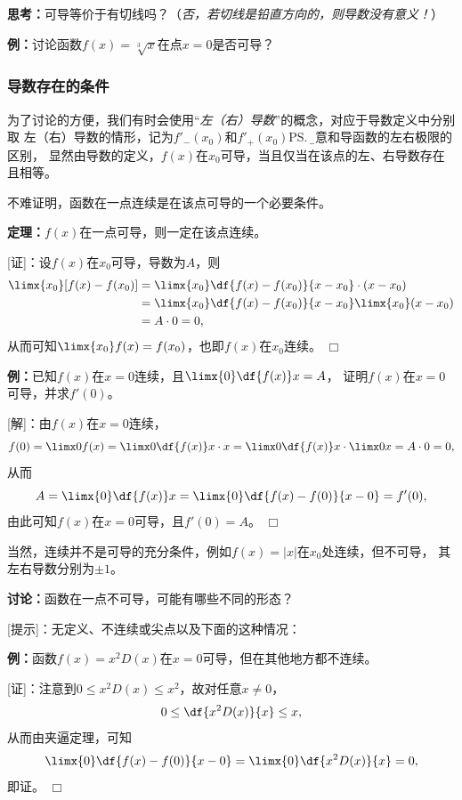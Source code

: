 {\b {\bf 思考：}可导等价于有切线吗？（{\it 否，若切线是铅直方向的，则导数没有意义！}）}

{\bf 例：}讨论函数$f(x)=\sqrt[3]x$在点$x=0$是否可导？

\subsubsection{导数存在的条件}

为了讨论的方便，我们有时会使用“{\it 左（右）导数}”的概念，对应于导数定义中分别取
左（右）导数的情形，记为$f'_-(x_0)$和$f'_+(x_0)$\ps{\b 注意和导函数的左右极限的区别}，
显然由导数的定义，$f(x)$在$x_0$可导，当且仅当在该点的左、右导数存在且相等。


% 

不难证明，函数在一点连续是在该点可导的一个必要条件。

{\bf 定理：}$f(x)$在一点可导，则一定在该点连续。

[证]：设$f(x)$在$x_0$可导，导数为$A$，则
\begin{align*}
	\limx{x_0}[f(x)-f(x_0)]
	&=\limx{x_0}\df{f(x)-f(x_0)}{x-x_0}\cdot(x-x_0)\\
	&=\limx{x_0}\df{f(x)-f(x_0)}{x-x_0}\limx{x_0}(x-x_0)\\
	&=A\cdot 0=0,
\end{align*}
从而可知$\limx{x_0}f(x)=f(x_0)$，也即$f(x)$在$x_0$连续。
\hfill$\Box$

{\bf 例：}已知$f(x)$在$x=0$连续，且$\limx{0}\df{f(x)}x=A$，
证明$f(x)$在$x=0$可导，并求$f'(0)$。

[解]：由$f(x)$在$x=0$连续，
$$f(0)=\limx0f(x)=\limx0\df{f(x)}x\cdot x
=\limx0\df{f(x)}x\cdot\limx0x=A\cdot 0=0,$$
从而
$$A=\limx{0}\df{f(x)}x=\limx{0}\df{f(x)-f(0)}{x-0}=f'(0),$$
由此可知$f(x)$在$x=0$可导，且$f'(0)=A$。
\hfill$\Box$

当然，连续并不是可导的充分条件，例如$f(x)=|x|$在$x_0$处连续，但不可导，
其左右导数分别为$\pm 1$。

{\bf 讨论：}函数在一点不可导，可能有哪些不同的形态？

[提示]：无定义、不连续或尖点以及下面的这种情况：

{\bf 例：}函数$f(x)=x^2D(x)$在$x=0$可导，但在其他地方都不连续。

[证]：注意到$0\leq x^2D(x)\leq x^2$，故对任意$x\ne 0$，
$$0\leq \df{x^2D(x)}{x}\leq x,$$
从而由夹逼定理，可知
$$\limx{0}\df{f(x)-f(0)}{x-0}=\limx{0}\df{x^2D(x)}{x}=0,$$
即证。
\hfill$\Box$

